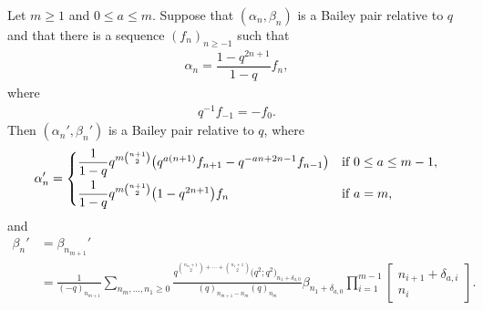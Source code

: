 \begin{Lemma} \label{lemma:mainpair}
	Let $m \geq 1$ and $0 \leq a \leq m$. Suppose that $(\alpha_n,\beta_n)$ is a Bailey pair relative to $q$ and that there is a sequence $(f_n)_{n \geq -1}$ such that
	\begin{align} \label{eqn:fdeflater}
		\alpha_n=\dfrac{1-q^{2n+1}}{1-q}f_n,
	\end{align}
	where
	\begin{align}
		q^{-1}f_{-1}=-f_0.
		\label{eqn:f-1f0}
	\end{align}
	Then $(\alpha_n',\beta_n')$ is a Bailey pair relative to $q$, where
	\begin{equation*} %
		\alpha_n' =
		\begin{cases}
			\dfrac{1}{1-q}q^{m\binom{n+1}{2}}\bigl(
			q^{a(n+1)}f_{n+1} -q^{-an+2n-1}f_{n-1}
			\bigr) & \text{if $0 \leq a \leq m-1$}, \vspace{1mm}\\
			\dfrac{1}{1-q}q^{m \binom{n+1}{2}}\bigl(1-q^{2n+1}\bigr)f_n &\text{if $a=m$},
		\end{cases}
	\end{equation*}
	and
	\begin{align}
		\beta_n' &{}= \beta_{n_{m+1}}' \nonumber \\
 &{}= \frac{1}{(-q)_{n_{m+1}}} \sum_{n_m, \dots, n_1 \geq 0} \frac{q^{\binom{n_m+1}{2} + \cdots + \binom{n_1+1}{2}}\bigl(q^2;q^2\bigr)_{n_1+\delta_{a,0}}}{(q)_{n_{m+1}-n_m} (q)_{n_m}} \beta_{n_1+\delta_{a,0}} \prod_{i=1}^{m-1} \begin{bmatrix} n_{i+1} + \delta_{a,i} \\ n_i \end{bmatrix}.\label{eqn:mainpairbeta}
	\end{align}
	
\end{Lemma}

